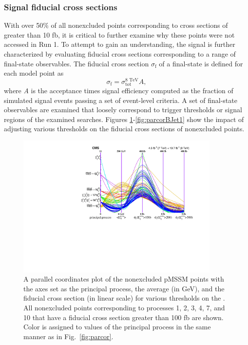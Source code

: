 \subsubsection{Signal fiducial cross sections}
With over 50\%
of all nonexcluded points corresponding to cross sections of
greater than 10 fb, it is critical to further examine why these points were not accessed in Run 1.  
To attempt to gain an
understanding, the signal is further characterized by evaluating fiducial cross sections corresponding to a
range of final-state observables. The fiducial cross section
$\sigma_{\text{f}}$ of a final-state is defined for each model point as 
 \begin{equation}
   \sigma_{\text{f}} = \sigma_{\text{tot}}^{\text{8 TeV}}A,
\end{equation}
where {\it A} is the acceptance times signal efficiency
computed as the fraction of simulated signal events
passing a set of event-level criteria. 
A set of final-state observables are examined that loosely correspond to trigger thresholds or
signal regions of the examined searches. Figures
\ref{fig:parcorMET}-\ref{fig:parcorBJet1} show the impact of adjusting
various thresholds on the fiducial cross sections of nonexcluded points.
\begin{figure}[tb!]
  \centering
         \includegraphics[width=0.9\textwidth]{figures/pMSSMpaper/parallel_coordinates/ParCorToposMET.pdf}
    \caption{A parallel coordinates plot of the nonexcluded pMSSM points
      with the axes set as the principal process, the average \MET{} (in GeV), and the 
    fiducial cross section (in linear scale) for various thresholds on the
    \MET{}. All nonexcluded points corresponding to processes 1, 2, 3,
    4, 7, and 10 that have a fiducial cross section greater than 100 fb are shown. Color is
    assigned to values of the principal process in the same manner as
    in Fig.~\ref{fig:parcor}.}
    \label{fig:parcorMET}
\end{figure}
